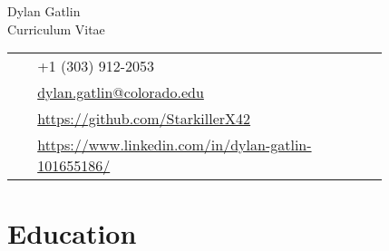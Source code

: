 \documentclass[11pt]{article} %
\begin{document}
\begin{paracol}{2} %


\parbox[top][0.12\textheight][c]{\linewidth}{
    \vspace{-0.04\textheight}
    \centering
    {\sffamily\Huge Dylan Gatlin}\\\medskip %
    {\Huge\color{headings}\cvtextfont Curriculum Vitae}
}
\switchcolumn

\parbox[top][0.12\textheight][c]{\linewidth}{
    \vspace{-0.04\textheight}
    \colorbox{shade}{
        \begin{supertabular}{p{0.05\linewidth}|p{0.775\linewidth}}
            \raisebox{-1pt}{\faPhone} & +1 (303) 912-2053 \\
            \raisebox{0pt}{\small\faEnvelope} &
             \href{mailto:dylan.gatlin@colorado.edu}
             {dylan.gatlin@colorado.edu} \\
            \raisebox{-1pt}{\faGithub} &
             \href{https://github.com/StarkillerX42}
             {https://github.com/StarkillerX42} \\
            \raisebox{-1pt}{\faLinkedinSquare} &
             \href{https://www.linkedin.com/in/dylan-gatlin-101655186/}
             {https://www.linkedin.com/in/dylan-gatlin-101655186/} \\
        \end{supertabular}
    }
}
\end{paracol}


\pagebreak[3]
\section{Education} 






\pagebreak[3]
\end{document}
